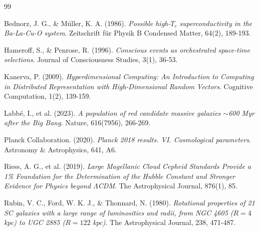 \documentclass[12pt,openany]{book}
\begin{document}
\backmatter

\begin{thebibliography}{99}

Bednorz, J. G., \& M\"{u}ller, K. A. (1986). \textit{Possible high-$T_c$ superconductivity in the Ba-La-Cu-O system}. Zeitschrift f\"{u}r Physik B Condensed Matter, 64(2), 189-193.

Hameroff, S., \& Penrose, R. (1996). \textit{Conscious events as orchestrated space-time selections}. Journal of Consciousness Studies, 3(1), 36-53.

Kanerva, P. (2009). \textit{Hyperdimensional Computing: An Introduction to Computing in Distributed Representation with High-Dimensional Random Vectors}. Cognitive Computation, 1(2), 139-159.

Labb\'{e}, I., et al. (2023). \textit{A population of red candidate massive galaxies $\sim$600 Myr after the Big Bang}. Nature, 616(7956), 266-269.

Planck Collaboration. (2020). \textit{Planck 2018 results. VI. Cosmological parameters}. Astronomy \& Astrophysics, 641, A6.

Riess, A. G., et al. (2019). \textit{Large Magellanic Cloud Cepheid Standards Provide a 1\% Foundation for the Determination of the Hubble Constant and Stronger Evidence for Physics beyond $\Lambda$CDM}. The Astrophysical Journal, 876(1), 85.

Rubin, V. C., Ford, W. K. J., \& Thonnard, N. (1980). \textit{Rotational properties of 21 SC galaxies with a large range of luminosities and radii, from NGC 4605 ($R = 4$ kpc) to UGC 2885 ($R = 122$ kpc)}. The Astrophysical Journal, 238, 471-487.

\end{thebibliography}
\end{document}
